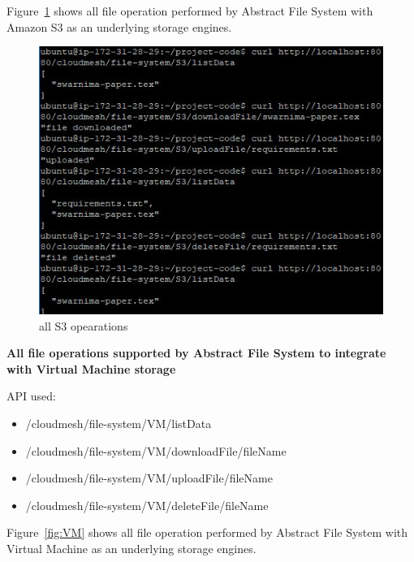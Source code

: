 Figure~\ref{fig:all-s3} shows all file operation performed by 
Abstract File System with Amazon S3 as an underlying storage engines. 

\begin{figure}[!ht]
        \centering\includegraphics[width=\columnwidth]
        {image/all-s3.JPG}
        \caption{all S3 opearations}\label{fig:all-s3}
\end{figure}


\textbf{All file operations supported by Abstract File System to integrate 
with Virtual Machine storage}


API used:
\begin{itemize}
    \item /cloudmesh/file-system/VM/listData
    \item /cloudmesh/file-system/VM/downloadFile/{fileName}
    \item /cloudmesh/file-system/VM/uploadFile/{fileName}
    \item /cloudmesh/file-system/VM/deleteFile/{fileName}
\end{itemize}

Figure~\ref{fig:VM} shows all file operation performed by Abstract 
File System with Virtual Machine as an underlying storage engines. 


